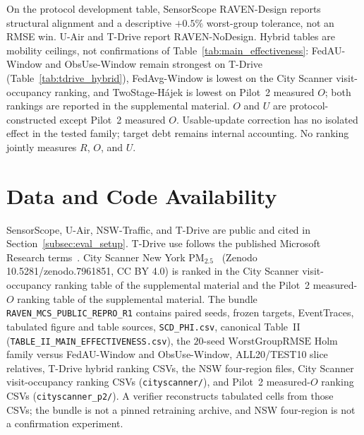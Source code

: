 \documentclass[letterpaper,journal]{IEEEtran}
\begin{document}
On the protocol development table, SensorScope RAVEN-Design reports
structural alignment and a descriptive $+0.5\%$ worst-group tolerance,
not an RMSE win.  U-Air and T-Drive report RAVEN-NoDesign.  Hybrid tables
are mobility ceilings, not confirmations of
Table~\ref{tab:main_effectiveness}: FedAU-Window and ObsUse-Window remain
strongest on T-Drive (Table~\ref{tab:tdrive_hybrid}), FedAvg-Window is
lowest on the City Scanner visit-occupancy ranking, and TwoStage-H\'ajek is
lowest on Pilot~2 measured $O$; both rankings are reported in the
supplemental material.
$O$ and $U$ are protocol-constructed except Pilot~2 measured $O$.
Usable-update correction has no isolated effect in the tested family;
target debt remains internal accounting.
No ranking jointly measures $R$, $O$, and $U$.

\section*{Data and Code Availability}
SensorScope, U-Air, NSW-Traffic, and T-Drive are public and cited in
Section~\ref{subsec:eval_setup}.  T-Drive use follows the published
Microsoft Research terms~\cite{yuan2010tdrive}.
City Scanner New York {PM}$_{2.5}$~\cite{wang2023cityscanner}
(Zenodo 10.5281/zenodo.7961851, CC BY 4.0) is ranked in
the City Scanner visit-occupancy ranking table of the supplemental material and
the Pilot~2 measured-$O$ ranking table of the supplemental material.
The bundle \texttt{RAVEN\_MCS\_PUBLIC\_REPRO\_R1} contains paired seeds,
frozen targets, EventTraces, tabulated figure and table sources,
\texttt{SCD\_PHI.csv}, canonical Table~II
(\texttt{TABLE\_II\_MAIN\_EFFECTIVENESS.csv}),
the $20$-seed $\mathrm{WorstGroupRMSE}$ Holm family versus FedAU-Window and
ObsUse-Window, ALL20/TEST10 slice relatives, T-Drive hybrid ranking
CSVs, the NSW four-region files, City Scanner visit-occupancy ranking
CSVs (\texttt{cityscanner/}), and Pilot~2 measured-$O$ ranking CSVs
(\texttt{cityscanner\_p2/}).
A verifier reconstructs tabulated cells from those CSVs; the
bundle is not a pinned retraining archive, and NSW four-region is not a
confirmation experiment.



\end{document}
